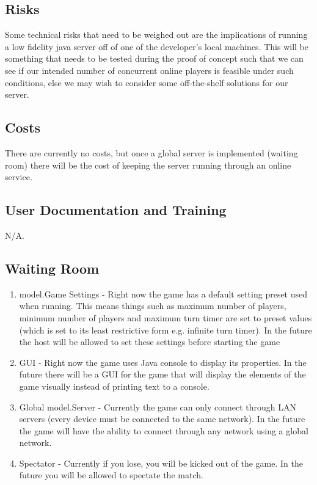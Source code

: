 \documentclass[12pt, titlepage]{article}
\begin{document}
\subsection{Risks}
Some technical risks that need to be weighed out are the implications of running a low fidelity java server off of one of the developer's local machines. This will be something that needs to be tested during the proof of concept such that we can see if our intended number of concurrent online players is feasible under such conditions, else we may wish to consider some off-the-shelf solutions for our server. 

\subsection{Costs}
There are currently no costs, but once a global server is implemented (waiting room) there will be the cost of keeping the server running through an online service.

\subsection{User Documentation and Training}
N/A.
\subsection{Waiting Room}
\begin{enumerate}
    \item model.Game Settings - Right now the game has a default setting preset used when running. This means things such as maximum number of players, minimum number of players and maximum turn timer are set to preset values (which is set to its least restrictive form e.g. infinite turn timer). In the future the host will be allowed to set these settings before starting the game
    
    \item GUI - Right now the game uses Java console to display its properties. In the future there will be a GUI for the game that will display the elements of the game visually instead of printing text to a console. 
    
    \item Global model.Server - Currently the game can only connect through LAN servers (every device must be connected to the same network). In the future the game will have the ability to connect through any network using a global network.
    
    \item Spectator - Currently if you lose, you will be kicked out of the game. In the future you will be allowed to spectate the match.

\end{enumerate}
    
\end{document}
